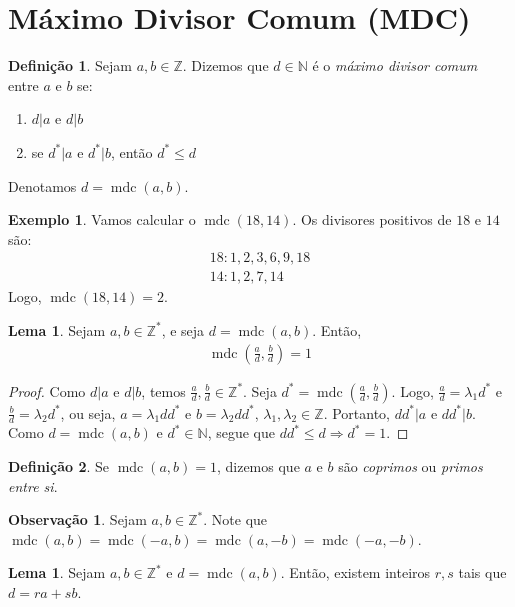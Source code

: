 \documentclass[a4paper,11pt,twoside, leqno]{article}
\DeclareMathOperator{\mdc}{mdc}
\theoremstyle{definition}
\newtheorem*{definition}{Definição}
\newtheorem{lemma}[theorem]{Lema}
\newtheorem{remark}{Observação}[section]
\newtheorem*{example}{Exemplo}
\begin{document}
\section{Máximo Divisor Comum (MDC)}
\hspace{12pt} \begin{definition}
	Sejam $a,b\in\mathbb{Z}$. Dizemos que $d\in\mathbb{N}$ é o {\em máximo divisor comum} entre $a$ e $b$ se:
	\begin{enumerate}
		\item $d|a$ e $d|b$
		\item se $d^\ast |a$ e $d^\ast |b$, então $d^\ast\leq d$
	\end{enumerate}
Denotamos $d = \mdc(a,b)$.
\end{definition}
\begin{example}
	Vamos calcular o $\mdc(18,14)$. Os divisores positivos de $18$ e $14$ são:
	\begin{align*}
	18: 1, 2, 3, 6, 9, 18 \\
	14: 1, 2, 7, 14
	\end{align*}
	Logo, $\mdc(18,14) = 2$.
\end{example}
\begin{lemma}
	\label{lema 3}
	Sejam $a,b\in\mathbb{Z}^\ast$, e seja $d = \mdc(a,b)$. Então, 
	\begin{align*}
	\mdc\left( \frac{a}{d}, \frac{b}{d} \right) = 1
	\end{align*}
\end{lemma}
\begin{proof}
	Como $d|a$ e $d|b$, temos $\displaystyle{ \frac{a}{d}, \frac{b}{d}\in\mathbb{Z}^\ast }$. Seja $\displaystyle{d^\ast = \mdc\left( \frac{a}{d}, \frac{b}{d} \right)}$. Logo, $\displaystyle{\frac{a}{d} = \lambda_1d^\ast}$ e $\displaystyle{\frac{b}{d} = \lambda_2d^\ast}$, ou seja, $a = \lambda_1dd^\ast$ e $b = \lambda_2dd^\ast$, $\lambda_1, \lambda_2\in\mathbb{Z}$. Portanto, $dd^\ast |a$ e $dd^\ast |b$. Como $d = \mdc(a,b)$ e $d^\ast\in\mathbb{N}$, segue que $dd^\ast\leq d \Rightarrow d^\ast = 1$.
\end{proof}
\begin{definition}
	Se $\mdc(a,b) = 1$, dizemos que $a$ e $b$ são {\em coprimos} ou {\em primos entre si}.
\end{definition}
\begin{remark}
	\label{obs 1}
	Sejam $a,b\in\mathbb{Z}^\ast$. Note que $\mdc(a,b) = \mdc(-a,b) = \mdc(a,-b) = \mdc(-a,-b)$.
\end{remark}
\begin{lemma}
	\label{lema 4}
	Sejam $a,b\in\mathbb{Z}^\ast$ e $d = \mdc(a,b)$. Então, existem inteiros $r,s$ tais que $d = ra + sb$.
\end{lemma}
\end{document}
